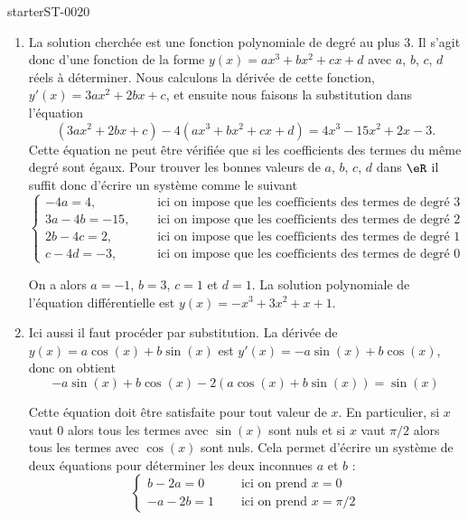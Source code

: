 
\begin{corrige}{starterST-0020}

 \begin{enumerate}
 \item La solution cherchée est une fonction polynomiale de degré au plus $3$. Il s'agit donc d'une fonction de la forme $y(x) = ax^3 + b x^2 + cx + d$ avec $a$, $b$, $c$, $d$ réels à déterminer. Nous calculons la dérivée de cette fonction, $y'(x) = 3ax^2 + 2b x + c$, et ensuite nous faisons la substitution dans l'équation 
   \[
   \left(3ax^2 + 2b x + c\right) - 4\left(ax^3 + b x^2 + cx + d\right) = 4x^3-15x^2+2x-3.
   \]
   Cette équation ne peut \^etre vérifiée que si les coefficients des termes du m\^eme degré sont égaux. Pour trouver les bonnes valeurs de $a$, $b$, $c$, $d$ dans $\eR$ il suffit donc d'écrire un système comme le suivant 
   \begin{equation*}
     \begin{cases}
       -4a = 4, \quad & \text{ ici on impose que les coefficients des termes de degré 3 soient égaux ; } \\
       3a -4b  = -15, \quad & \text{ ici on impose que les coefficients des termes de degré 2 soient égaux ; } \\
       2b -4c = 2, \quad & \text{ ici on impose que les coefficients des termes de degré 1 soient égaux ; } \\
       c-4d = -3, \quad & \text{ ici on impose que les coefficients des termes de degré 0 soient égaux. }
     \end{cases}
   \end{equation*}
   
   On a alors $a = -1$, $b = 3$, $c = 1$ et $d = 1$. La solution polynomiale de l'équation différentielle est  $y(x) = -x^3 + 3 x^2 + x +1$.  
 \item Ici aussi il faut procéder par substitution. La dérivée de $y(x) = a\cos (x)+ b\sin (x)$ est $y'(x) = -a\sin (x)+ b\cos (x)$, donc on obtient
   \[
   -a\sin (x)+ b\cos (x)  - 2\left( a\cos (x)+ b\sin (x)\right) = \sin(x)
   \]
      
      Cette équation doit \^etre satisfaite pour tout valeur de $x$. En particulier, si $x$ vaut $0$ alors tous les termes avec $\sin(x)$ sont nuls et si $x$ vaut $\pi/2$ alors tous les termes avec $\cos(x)$ sont nuls. Cela permet d'écrire un système de deux équations pour déterminer les deux inconnues $a$ et $b$ :
      \begin{equation*}
        \begin{cases}
          b  - 2 a = 0 \quad & \text{ ici on prend }x= 0   \\
          -a -2b = 1 \quad & \text{ ici on prend }x= \pi/2  
        \end{cases}
      \end{equation*}
 \end{enumerate}
 
\end{corrige}

